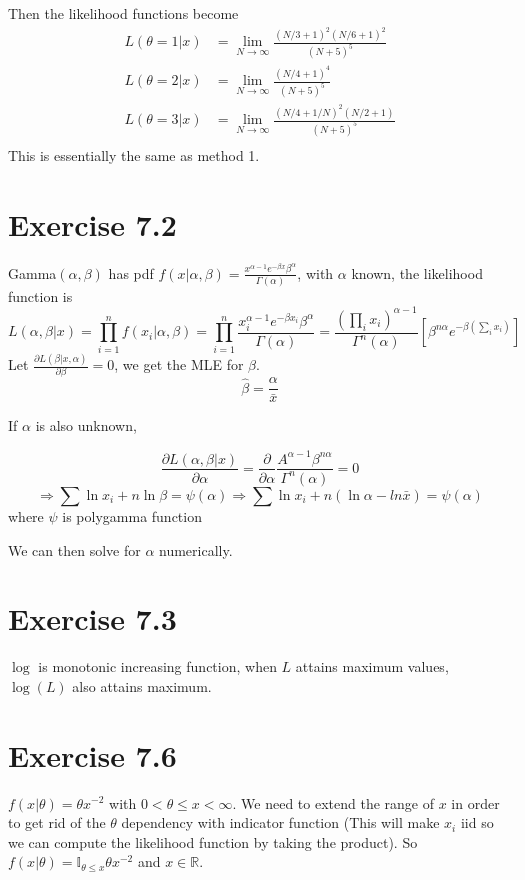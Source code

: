 \documentclass[12pt]{article}
\begin{document}
 Then the likelihood functions become 
 \begin{equation*}
 	\begin{split}
     L(\theta=1|x) &= \lim_{N \rightarrow \infty}\frac{(N/3 + 1)^2(N/6 + 1)^2}{(N + 5)^5} \\
 	L(\theta=2|x) &= \lim_{N \rightarrow \infty}\frac{(N/4 + 1)^4}{(N + 5)^5} \\
 	L(\theta=3|x) &= \lim_{N \rightarrow \infty}\frac{(N/4 + 1/ N)^2(N/2 + 1)}{(N + 5)^5} \\
 	\end{split}
 \end{equation*}
This is essentially the same as method 1.


\section*{Exercise 7.2}
 Gamma$(\alpha, \beta)$ has pdf $f(x|\alpha, \beta) = \frac{x^{\alpha - 1} e^{-\beta x} \beta^\alpha}{\Gamma(\alpha)}$, with $\alpha$ known, the likelihood function is $$
   L(\alpha, \beta|x) = \prod^n_{i=1} f(x_i |\alpha, \beta) 
   = \prod^n_{i=1}\frac{x_i^{\alpha - 1} e^{-\beta x_i}\beta^\alpha}{\Gamma(\alpha)} = \frac{(\prod_i x_i)^{\alpha - 1}}{\Gamma^n(\alpha)} \left[ \beta^{n \alpha} e^{- \beta (\sum_i x_i)}\right]
 $$
 Let $\frac{\partial L(\beta|x, \alpha)}{\partial \beta} = 0$, we get the MLE for $\beta$. $$\hat{\beta} = \frac{\alpha}{\bar{x}}$$
 
If $\alpha$ is also unknown, 

$$
  \frac{\partial L(\alpha, \beta |x)}{\partial \alpha} =  
  \frac{\partial}{\partial \alpha}  \frac{A^{\alpha - 1}  \beta^{n \alpha}}{\Gamma^n(\alpha)} = 0 $$ 
$$
  \Rightarrow  \sum \ln x_i + n \ln \beta = \psi (\alpha)
   \Rightarrow \sum \ln x_i + n (\ln \alpha - ln \bar{x}) = \psi (\alpha)
$$
 where $\psi$ is polygamma function

We can then solve for $\alpha$ numerically.

\section*{Exercise 7.3}
$\log$ is monotonic increasing function, when $L$ attains maximum values, $\log (L)$ also attains maximum.


\section*{Exercise 7.6}
$f(x|\theta) = \theta x^{-2}$ with $0 < \theta \leq x < \infty$. We need to extend the range of $x$ in order to get rid of the $\theta$ dependency with indicator function (This will make $x_i$ iid so we can compute the likelihood function by taking the product). So $f(x | \theta) =  \mathbb{I}_{\theta \leq x} \theta x^{-2}$ and $x \in \mathbb{R}$. 
\end{document}
